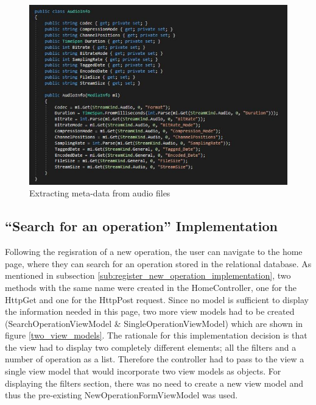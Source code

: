 \begin{figure}[!ht]
\begin{center}
\includegraphics[width=17cm]{imgs/audio_extracting.jpg}
\end{center}\vspace{-0.3cm}
\caption[Extracting meta-data from audio files]{Extracting meta-data from audio files} \label{audio_extracting}
\end{figure}




\subsection{``Search for an operation'' Implementation}
\label{sub:search_for_an_operation_implementation}

Following the regisration of a new operation, the user can navigate to the home page, where they can search for an operation stored in the relational database. As mentioned in subsection \ref{sub:register_new_operation_implementation}, two methods with the same name were created in the HomeController, one for the HttpGet and one for the HttpPost request. Since no model is sufficient to display the information needed in this page, two more view models had to be created (SearchOperationViewModel \& SingleOperationViewModel) which are shown in figure \ref{two_view_models}. The rationale for this implementation decision is that the view had to display two completely different elements; all the filters and a number of operation as a list. Therefore the controller had to pass to the view a single view model that would incorporate two view models as objects. For displaying the filters section, there was no need to create a new view model and thus the pre-existing NewOperationFormViewModel was used. 

